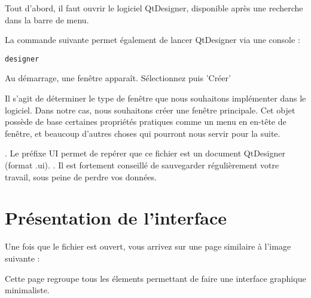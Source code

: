 \documentclass[12pt]{report}    %
\begin{document}
Tout d'abord, il faut ouvrir le logiciel QtDesigner, disponible après une recherche dans la barre de menu.


La commande suivante permet également de lancer QtDesigner via une console : 
\begin{lstlisting}
designer
\end{lstlisting}
Au démarrage, une fenêtre apparaît. Sélectionnez  puis 'Créer'



Il s'agit de déterminer le type de fenêtre que nous souhaitons implémenter dans le logiciel. Dans notre cas, nous souhaitons créer une fenêtre principale. Cet objet possède de base certaines propriétés pratiques comme un menu en en-tête de fenêtre, et beaucoup d'autres choses qui pourront nous servir pour la suite.

. \newline
Le préfixe UI permet de repérer que ce fichier est un document QtDesigner (format .ui). . \newline \newline 
{\color{red}Il est fortement conseillé de sauvegarder régulièrement votre travail, sous peine de perdre vos données.}




\section{Présentation de l'interface}

Une fois que le fichier  est ouvert, vous arrivez sur une page similaire à l'image suivante : \newline


Cette page regroupe tous les élements permettant de faire une interface graphique minimaliste.
\end{document}
